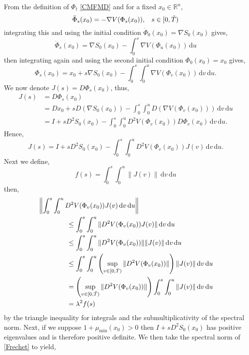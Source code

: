 \documentclass[a4paper,12pt,draft]{report}
\theoremstyle{remark}
\theoremstyle{definition}
\begin{document}
{
From the definition of $\Phi_t$ \eqref{CMFMD} and for a fixed $x_0 \in \mathbb{R}^n$,
$$
\ddot{\Phi}_s(x_0) = -\nabla V(\Phi_s(x_0)), \hspace{0.3cm} s \in [0, \tilde{T})
$$
integrating this and using the initial condition $\dot{\Phi}_0(x_0) = \nabla S_0(x_0)$ gives,
$$
\dot{\Phi}_s(x_0) = \nabla S_0(x_0) - \int_0^s\nabla V(\Phi_u(x_0))\,\mathrm{d}u
$$
then integrating again and using the second initial condition $\Phi_0(x_0) = x_0$ gives,
$$
\Phi_s(x_0) = x_0 + s\nabla S_0(x_0) - \int_0^s\int_0^u \nabla V(\Phi_v(x_0))\,\mathrm{d}v\,\mathrm{d}u.
$$
We now denote $J(s) = D\Phi_s(x_0)$, thus,
\begin{align}
J(s) & = D\Phi_s(x_0)\nonumber\\
& = Dx_0 + sD(\nabla S_0(x_0)) - \int_0^s\int_0^u D(\nabla V(\Phi_v(x_0)))\,\mathrm{d}v\,\mathrm{d}u\nonumber\\
& = I + sD^2S_0(x_0) - \int_0^s\int_0^u D^2V(\Phi_v(x_0))D\Phi_v(x_0)\,\mathrm{d}v\,\mathrm{d}u.\nonumber
\end{align}
Hence,
\begin{equation}
J(s) = I + sD^2S_0(x_0) - \int_0^s\int_0^u D^2V(\Phi_v(x_0))J(v)\,\mathrm{d}v\,\mathrm{d}u. \label{Frechet}
\end{equation}
Next we define,
$$
f(s) = \int_0^s\int_0^u \|J(v)\|\,\mathrm{d}v\,\mathrm{d}u
$$
then,
\begin{align}
& \left\|\int_0^s\int_0^u D^2V(\Phi_v(x_0))J(v)\,\mathrm{d}v\,\mathrm{d}u\right\|\nonumber\\
& \hspace{1.5cm} \le \int_0^s\int_0^u \|D^2V(\Phi_v(x_0))J(v)\|\,\mathrm{d}v\,\mathrm{d}u\nonumber\\
& \hspace{1.5cm} \le \int_0^s\int_0^u \|D^2V(\Phi_v(x_0))\|\|J(v)\|\,\mathrm{d}v\,\mathrm{d}u\nonumber\\
& \hspace{1.5cm} \le \int_0^s\int_0^u \left(\sup_{v \in [0, \tilde{T})}\|D^2V(\Phi_v(x_0))\|\right)\|J(v)\|\,\mathrm{d}v\,\mathrm{d}u\nonumber\\
& \hspace{1.5cm} = \left(\sup_{v \in [0, \tilde{T})}\|D^2V(\Phi_v(x_0))\|\right) \int_0^s\int_0^u \|J(v)\|\,\mathrm{d}v\,\mathrm{d}u\nonumber\\
& \hspace{1.5cm} = \lambda^2 f(s)\nonumber
\end{align}
by the triangle inequality for integrals and the submultiplicativity of the spectral norm.  Next, if we suppose $1 + \mu_{\mathrm{min}}(x_0) > 0$ then $ I + sD^2S_0(x_0)$ has positive eigenvalues and is therefore positive definite.  We then take the spectral norm of \eqref{Frechet} to yield,
}
\end{document}
